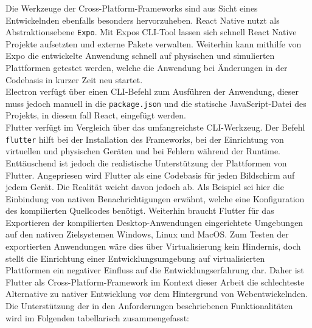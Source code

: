\documentclass[a4paper]{scrartcl}
\begin{document}
Die Werkzeuge der Cross-Platform-Frameworks sind aus Sicht eines Entwickelnden ebenfalls besonders hervorzuheben. React Native nutzt als Abstraktionsebene \texttt{Expo}. Mit Expos CLI-Tool lassen sich schnell React Native Projekte aufsetzten und externe Pakete verwalten. Weiterhin kann mithilfe von Expo die entwickelte Anwendung schnell auf physischen und simulierten Plattformen getestet werden, welche die Anwendung bei Änderungen in der Codebasis in kurzer Zeit neu startet. \\
Electron verfügt über einen CLI-Befehl zum Ausführen der Anwendung, dieser muss jedoch manuell in die \texttt{package.json} und die statische JavaScript-Datei des Projekts, in diesem fall React, eingefügt werden. \\
Flutter verfügt im Vergleich über das umfangreichste CLI-Werkzeug. Der Befehl \texttt{flutter} hilft bei der Installation des Frameworks, bei der Einrichtung von virtuellen und physischen Geräten und bei Fehlern während der Runtime. \\

Enttäuschend ist jedoch die realistische Unterstützung der Plattformen von Flutter. Angepriesen wird Flutter als eine Codebasis für jeden Bildschirm auf jedem Gerät. Die Realität weicht davon jedoch ab. Als Beispiel sei hier die Einbindung von nativen Benachrichtigungen erwähnt, welche eine Konfiguration des kompilierten Quellcodes benötigt. Weiterhin braucht Flutter für das Exportieren der kompilierten Desktop-Anwendungen eingerichtete Umgebungen auf den nativen Zielsystemen Windows, Linux und MacOS. Zum Testen der exportierten Anwendungen wäre dies über Virtualisierung kein Hindernis, doch stellt die Einrichtung einer Entwicklungsumgebung auf virtualisierten Plattformen ein negativer Einfluss auf die Entwicklungserfahrung dar. Daher ist Flutter als Cross-Platform-Framework im Kontext dieser Arbeit die schlechteste Alternative zu nativer Entwicklung vor dem Hintergrund von Webentwickelnden. \\

Die Unterstützung der in den Anforderungen beschriebenen Funktionalitäten wird im Folgenden tabellarisch zusammengefasst:
\end{document}
